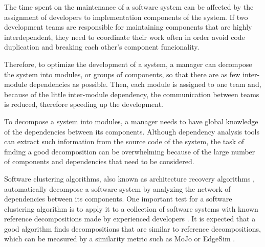 %

%
The time spent on the maintenance of a software system can be affected by the
assignment of developers to implementation components of the system.
If two development teams are responsible for maintaining components that are
highly interdependent, they need to coordinate their work often in order avoid
code duplication and breaking each other's component funcionality.

Therefore, to optimize the development of a system, a manager can decompose the
system into modules, or groups of components, so that there are as few
inter-module dependencies as possible. %
Then, each module is assigned to one team and, because of the little inter-module
dependency, the communication between teams is reduced, therefore speeding up
the development.

%
%
%
%
%
%
%

To decompose a system into modules, a manager needs to have global knowledge of
the dependencies between its components. Although dependency analysis tools can
extract such information from the source code of the system, the task of finding
a good decomposition can be overwhelming because of the large number of
components and dependencies that need to be considered.

Software clustering algorithms, also known as architecture recovery algorithms
\cite{Mancoridis1998,Anquetil1999,Tzerpos2000,Andritsos2005},
automatically decompose a software system by analyzing the network of
dependencies between its components. %
One important test for a software clustering algorithm is to apply it to a
collection of software systems with known reference decompositions made by
experienced developers \cite{Anquetil1999}. It is expected that a good algorithm
finds decompositions that are similar to reference decompositions, which can be
measured by a similarity metric such as MoJo \cite{Tzerpos1999} or EdgeSim
\cite{Mitchell2001}.

